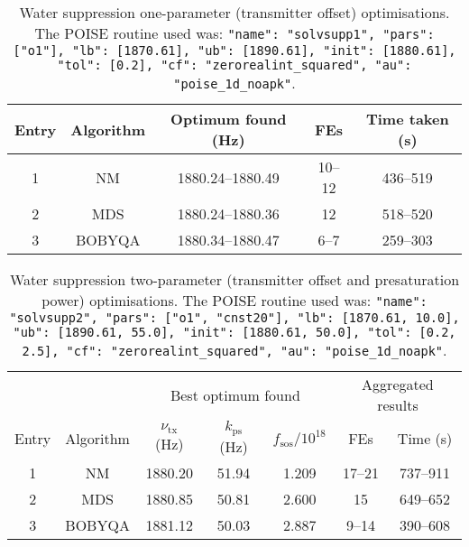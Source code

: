 \begin{table}
    \centering
    \begin{tabular}{ccccc}
        \toprule
        Entry & Algorithm & Optimum found (\unit{\Hz}) & FEs    & Time taken (\unit{\s}) \\
        \midrule
        1     & NM        & 1880.24--1880.49         & 10--12 & 436--519             \\
        2     & MDS       & 1880.24--1880.36         & 12     & 518--520             \\
        3     & BOBYQA    & 1880.34--1880.47         & 6--7   & 259--303             \\
        \bottomrule
    \end{tabular}
    \caption[Water suppression one-parameter optimisations]{
        Water suppression one-parameter (transmitter offset) optimisations.
        The POISE routine used was: \texttt{{"name": "solvsupp1", "pars": ["o1"], "lb": [1870.61], "ub": [1890.61], "init": [1880.61], "tol": [0.2], "cf": "zerorealint_squared", "au": "poise_1d_noapk"}}.
    }
    \label{tbl:poise_solvsupp1p}
\end{table}

\begin{table}
    \centering
    \begin{tabular}{ccccccc}
        \toprule
              &           & \multicolumn{3}{c}{Best optimum found} & \multicolumn{2}{c}{Aggregated results} \\
                            \cmidrule(lr){3-5}                       \cmidrule(lr){6-7}
        Entry & Algorithm & $\nu_\text{tx}$ (\unit{\Hz}) & $k_\text{ps}$ (\unit{\Hz}) & $f_\text{sos} / 10^{18}$ & FEs    & Time (\unit{\s}) \\
        \midrule
        1     & NM        & 1880.20                    & 51.94          & 1.209                    & 17--21 & 737--911       \\
        2     & MDS       & 1880.85                    & 50.81          & 2.600                    & 15     & 649--652       \\
        3     & BOBYQA    & 1881.12                    & 50.03          & 2.887                    & 9--14  & 390--608       \\
        \bottomrule
    \end{tabular}
    \caption[Water suppression two-parameter optimisations]{
        Water suppression two-parameter (transmitter offset and presaturation power) optimisations.
        The POISE routine used was: \texttt{{"name": "solvsupp2", "pars": ["o1", "cnst20"], "lb": [1870.61, 10.0], "ub": [1890.61, 55.0], "init": [1880.61, 50.0], "tol": [0.2, 2.5], "cf": "zerorealint_squared", "au": "poise_1d_noapk"}}.
    }
    \label{tbl:poise_solvsupp2p}
\end{table}

